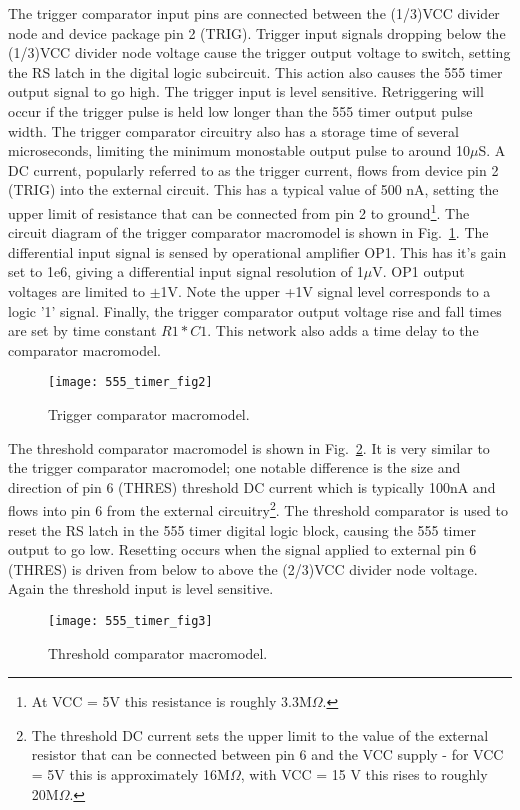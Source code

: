 The trigger comparator input pins are connected between the (1/3)VCC divider node and device package pin 2 (TRIG). Trigger input signals dropping below the (1/3)VCC divider node voltage cause the trigger output voltage to switch, setting the RS latch in the digital logic subcircuit.  This action also causes the 555 timer output signal to go high. The trigger input is level sensitive. Retriggering will occur if the trigger pulse is held low longer than the 555 timer output pulse width. The trigger comparator circuitry also has a storage time of several microseconds, limiting the minimum monostable output pulse to around 10$\mu$S. A DC current, popularly referred to as the trigger current, flows from device pin 2 (TRIG) into the external circuit. This has a typical value of 500 nA, setting the upper limit of resistance that can be connected from pin 2 to ground\footnote{At VCC = 5V this resistance is roughly 3.3M$\Omega$.}.  The circuit diagram of the trigger comparator macromodel is shown in Fig.~\ref{fig:555_timer_fig2}. The differential input signal is sensed by operational amplifier OP1. This has it's gain set to 1e6, giving a differential input signal resolution of 1$\mu$V. OP1 output voltages are limited to $\pm$1V. Note the upper +1V signal level corresponds to a logic '1' signal. Finally, the trigger comparator output voltage rise and fall times are set by time constant $R1*C1$. This network also adds a time delay to the comparator macromodel.
\FloatBarrier
\begin{figure}[ht]
  \centering
  \texttt{[image: 555\_timer\_fig2]}
  \caption{Trigger comparator macromodel.}
  \label{fig:555_timer_fig2} 
\end{figure} 
\FloatBarrier
\addvspace{12pt}

The threshold comparator macromodel is shown in Fig.~\ref{fig:555_timer_fig3}. It is very similar to the trigger comparator macromodel; one notable difference is the size and direction of pin 6 (THRES) threshold DC current which is typically 100nA and flows into pin 6 from the external circuitry\footnote{The threshold DC current sets the upper limit to the value of the external resistor that can be connected between pin 6 and the VCC supply - for VCC = 5V this is approximately 16M$\Omega$, with VCC = 15 V this rises to roughly 20M$\Omega$.}. The threshold comparator is used to reset the RS latch in the 555 timer digital logic block, causing the 555 timer output to go low. Resetting occurs when the signal applied to external pin 6 (THRES) is driven from below to above the (2/3)VCC divider node voltage.  Again the threshold input is level sensitive.
\FloatBarrier
\begin{figure}[ht]
  \centering
  \texttt{[image: 555\_timer\_fig3]}
  \caption{Threshold comparator macromodel.}
  \label{fig:555_timer_fig3} 
\end{figure} 
\FloatBarrier

